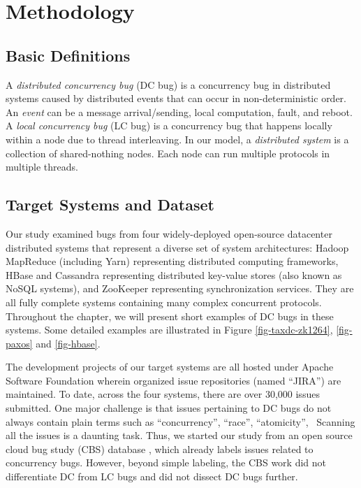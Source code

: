 

\section{Methodology}
\label{sec-met}



\subsection{Basic Definitions}
\label{met-def}

A {\em distributed concurrency bug} (DC bug) is a concurrency bug in distributed
systems caused by distributed events that can occur in non-deterministic order.
An {\em event} can be a message arrival/sending, local computation, fault, and
reboot.
%
A {\em local concurrency bug} (LC bug) is a concurrency bug that happens locally
within a node due to thread interleaving.
%
In our model, a {\em distributed system} is a collection of shared-nothing
nodes.  Each node can run multiple protocols in multiple threads.
%


\subsection{Target Systems and Dataset}
\label{met-data}


Our study examined bugs from four widely-deployed
open-source datacenter distributed
systems that represent a diverse set of system architectures: Hadoop
MapReduce (including Yarn) \cite{HadoopWeb} representing distributed
computing frameworks, HBase \cite{HBaseWeb} and Cassandra
\cite{CassandraWeb} representing distributed key-value stores (also
known as NoSQL systems), and ZooKeeper \cite{ZooKeeperWeb}
representing synchronization services.
%
They are all fully complete systems containing many complex concurrent
protocols.  Throughout the chapter, we will present short examples of DC
bugs in these systems.  Some detailed examples are illustrated in Figure
\ref{fig-taxdc-zk1264}, \ref{fig-paxos} and \ref{fig-hbase}.

The development projects of our target systems are all hosted under
Apache Software Foundation wherein organized issue repositories (named
``JIRA'') are maintained.  To date, across the four systems, there are
over 30,000 issues submitted.  One major challenge is that issues
pertaining to DC bugs do not always contain plain terms such as
``concurrency'', ``race'', ``atomicity'', \etc\ Scanning all the
issues is a daunting task.  Thus, we started our study from an open
source cloud bug study (CBS) database \cite{CBSWeb}, which already
labels issues related to concurrency bugs.  However, beyond simple
labeling, the CBS work did not differentiate DC from LC bugs and did
not dissect DC bugs further.


